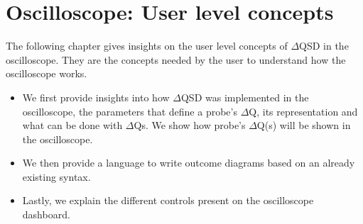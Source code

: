 \chapter{Oscilloscope: User level concepts}
    The following chapter gives insights on the user level concepts of $\Delta$QSD in the oscilloscope. They are the concepts needed by the user to understand how the oscilloscope works.
    \begin{itemize}
        \item We first provide insights into how $\Delta$QSD was implemented in the oscilloscope, the parameters that define a probe's $\Delta$Q, its representation and what can be done with $\Delta$Qs. We show how probe's $\Delta$Q(s) will be shown in the oscilloscope.
        \item We then provide a language to write outcome diagrams based on an already existing syntax.
        \item Lastly, we explain the different controls present on the oscilloscope dashboard.
    \end{itemize}







